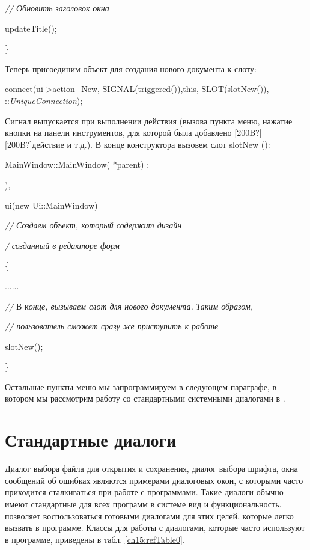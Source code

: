  \textit{//} \textit{Обновить} \textit{заголовок} \textit{окна}

 updateTitle();

\}

Теперь присоединим объект  для создания нового документа к слоту: 

connect(ui-{>}action\_New, SIGNAL(triggered()),this, SLOT(slotNew()), ::\textit{UniqueConnection});

Сигнал выпускается при выполнении действия (вызова пункта меню, нажатие кнопки на панели инструментов, для которой была
добавлено \textlatin{[200B?]}\textlatin{[200B?]}действие и т.д.). В конце конструктора вызовем слот slotNew (): 

MainWindow::MainWindow( *parent) :

 ),

ui(new Ui::MainWindow) 

\textit{//} \textit{Создаем объект, который содержит дизайн}\textit{ }

\textit{/} \textit{созданный в редакторе форм}

\{

......

\textit{//} В к\textit{онце, вызываем слот для нового документа.}\textit{ }\textit{Таким образом,}

\textit{// пользователь сможет сразу же приступить к работе}\textit{ }

 slotNew();

\}

Остальные пункты меню мы запрограммируем в следующем параграфе, в котором мы рассмотрим работу со стандартными
системными диалогами в . 

\section[\ Стандартные диалоги]{ Стандартные диалоги}
Диалог выбора файла для открытия и сохранения, диалог выбора шрифта, окна сообщений об ошибках являются примерами
диалоговых окон, с которыми часто приходится сталкиваться при работе с программами. Такие диалоги обычно имеют
стандартные для всех программ в системе вид и функциональность.  позволяет воспользоваться готовыми диалогами для
этих целей, которые легко вызвать в программе. Классы для работы с диалогами, которые часто используют в программе,
приведены в табл. \ref{ch15:refTable0}.

